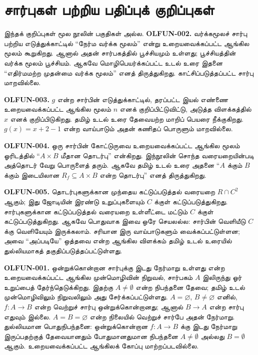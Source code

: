 \section*{சார்புகள் பற்றிய பதிப்புக் குறிப்புகள்}
இந்தக் குறிப்புகள் மூல நூலின் பகுதிகள் அல்ல.
\textbf{OLFUN-002.} வர்க்கமூலச் சார்பு பற்றிய எடுத்துக்காட்டில்
“நேர்ம வர்க்க மூலம்” என்று உறையவைக்கப்பட்ட ஆங்கில மூலம் கூறுகிறது.
ஆனால் அதன் சார்பகத்தில் பூச்சியமும் உள்ளது; பூச்சியத்தின் வர்க்க மூலம்
பூச்சியம். ஆகவே மொழிபெயர்க்கப்பட்ட உடல் உரை இதனை
“எதிர்மமற்ற முதன்மை வர்க்க மூலம்” எனத் திருத்துகிறது.
காட்சிப்படுத்தப்பட்ட சார்பு மாறவில்லை.

\textbf{OLFUN-003.} $g$ என்ற சார்பின் எடுத்துக்காட்டில்,
தரப்பட்ட இயல் எண்ணை உறையவைக்கப்பட்ட ஆங்கில மூலம் $n$ எனக்
குறிப்பிட்டுவிட்டு, அடுத்த விளக்கத்தில் $x$ எனக் குறிப்பிடுகிறது.
தமிழ் உடல் உரை தேவையற்ற மாறிப் பெயரை நீக்குகிறது.
$g(x)=x+2-1$ என்ற வாய்பாடும் அதன் கணிதப் பொருளும் மாறவில்லை.

\textbf{OLFUN-004.} ஒரு சார்பின் கோட்டுருவை உறையவைக்கப்பட்ட
ஆங்கில மூலம் ஓரிடத்தில் “$A\times B$ மீதான தொடர்பு” என்கிறது.
இந்நூலின் சொந்த வரையறையின்படி அத்தொடர் வேறு பொருளைத் தரும்.
ஆகவே தமிழ் உடல் உரை அதனை “$A$ க்கும் $B$ க்கும் இடையிலான
$R_f\subseteq A\times B$ என்ற தொடர்பு” எனத் திருத்துகிறது.

\textbf{OLFUN-005.} தொடர்புகளுக்கான முந்தைய கட்டுப்படுத்தல் வரையறை
$R\cap C^2$ ஆகும்;
இது ஜோடியின் இரண்டு உறுப்புகளையும் $C$ க்குள் கட்டுப்படுத்துகிறது.
சார்புகளுக்கான கட்டுப்படுத்தல் வரையறை உள்ளீட்டை மட்டும் $C$ க்குள்
கட்டுப்படுத்துகிறது. ஆகவே பொதுவாக இவை ஒரே செயலல்ல:
சார்பின் வெளியீடு $C$ க்கு வெளியேயும் இருக்கலாம்.
சரியான இரு வாய்பாடுகளும் வைக்கப்பட்டுள்ளன; அவை “அப்படியே”
ஒத்தவை என்ற ஆங்கில விளக்கம் தமிழ் உடல் உரையில் துல்லியமாகத்
தகுதிப்படுத்தப்பட்டுள்ளது.

\textbf{OLFUN-001.} ஒன்றுக்கொன்றான சார்புக்கு இடது நேர்மாறு
உள்ளது என்ற உறையவைக்கப்பட்ட ஆங்கில முன்மொழிவின் நிறுவல்,
சார்பகம் $A$ இலிருந்து ஓர் உறுப்பைத் தேர்ந்தெடுக்கிறது.
இதற்கு $A\neq\emptyset$ என்ற நிபந்தனை தேவை; தமிழ் உடல்
முன்மொழிவிலும் நிறுவலிலும் அது சேர்க்கப்பட்டுள்ளது.
$A=\varnothing$, $B\ne\varnothing$ எனில்,
$f\colon A\to B$ என்ற வெற்றுச் சார்பு ஒன்றுக்கொன்றானது;
ஆனால் $B\to A$ என்ற சார்பு எதுவும் இல்லை.
$A=B=\varnothing$ என்ற நிலையில் வெற்றுச் சார்பே அதன் நேர்மாறு.
துல்லியமான பொதுநிபந்தனை: ஒன்றுக்கொன்றான
$f\colon A\to B$ க்கு இடது நேர்மாறு இருப்பதற்குத் தேவையானதும்
போதுமானதுமான நிபந்தனை $A\neq\emptyset$ அல்லது $B=\emptyset$ ஆகும்.
உறையவைக்கப்பட்ட ஆங்கிலக் கோப்பு மாற்றப்படவில்லை.
